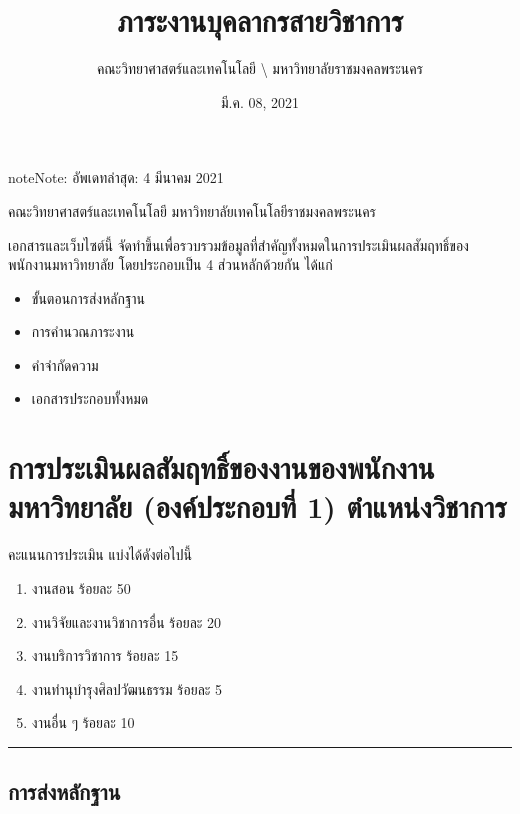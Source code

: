 \documentclass[a4paper,12pt,english]{sphinxmanual}
\title{ภาระงานบุคลากรสายวิชาการ}
\date{มี.ค. 08, 2021}
\author{คณะวิทยาศาสตร์และเทคโนโลยี \textbackslash{} มหาวิทยาลัยราชมงคลพระนคร}
\begin{document}
\pagestyle{empty}
\sphinxmaketitle
\pagestyle{plain}
\sphinxtableofcontents
\pagestyle{normal}
\label{\detokenize{index::doc}}
\begin{sphinxadmonition}{note}{Note:}
อัพเดทล่าสุด: 4 มีนาคม 2021
\end{sphinxadmonition}



คณะวิทยาศาสตร์และเทคโนโลยี มหาวิทยาลัยเทคโนโลยีราชมงคลพระนคร

เอกสารและเว็บไซต์นี้ จัดทำขึ้นเพื่อรวบรวมข้อมูลที่สำคัญทั้งหมดในการประเมินผลสัมฤทธิ์ของพนักงานมหาวิทยาลัย โดยประกอบเป็น 4 ส่วนหลักด้วยกัน ได้แก่
\begin{itemize}
\item {} 
ขั้นตอนการส่งหลักฐาน

\item {} 
การคำนวณภาระงาน

\item {} 
คำจำกัดความ

\item {} 
เอกสารประกอบทั้งหมด

\end{itemize}


\chapter{การประเมินผลสัมฤทธิ์ของงานของพนักงานมหาวิทยาลัย (องค์ประกอบที่ 1)  ตำแหน่งวิชาการ}
\label{\detokenize{submission_part1:id1}}\label{\detokenize{submission_part1::doc}}
คะแนนการประเมิน แบ่งได้ดังต่อไปนี้
\begin{enumerate}
%
\item {} 
งานสอน ร้อยละ 50

\item {} 
งานวิจัยและงานวิชาการอื่น ร้อยละ 20

\item {} 
งานบริการวิชาการ ร้อยละ 15

\item {} 
งานทำนุบำรุงศิลปวัฒนธรรม ร้อยละ 5

\item {} 
งานอื่น ๆ ร้อยละ 10

\end{enumerate}


\bigskip\hrule\bigskip



\section{การส่งหลักฐาน}
\label{\detokenize{submission_part1:id2}}
\end{document}
